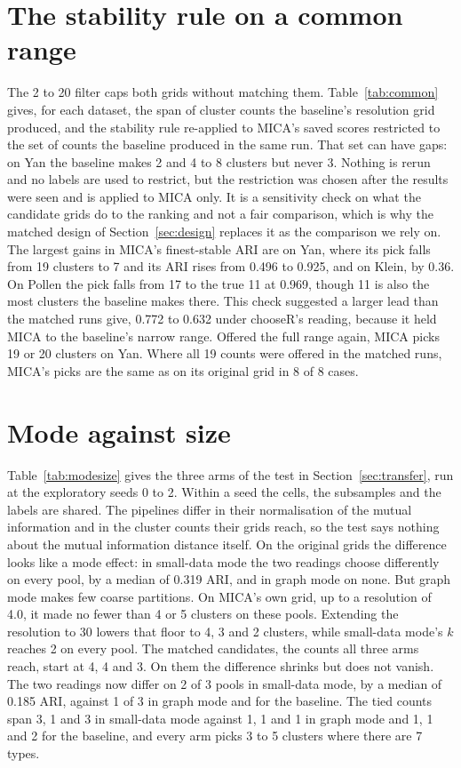 

\section{The stability rule on a common range}\label{app:common}
The 2 to 20 filter caps both grids without matching them. Table~\ref{tab:common} gives, for each
dataset, the span of cluster counts the baseline's resolution grid produced, and the stability
rule re-applied to MICA's saved scores restricted to the set of counts the baseline produced in
the same run. That set can have gaps: on Yan the baseline makes 2 and 4 to 8 clusters but never
3. Nothing is rerun and no labels are used to restrict, but the restriction was chosen after the
results were seen and is applied to MICA only. It is a sensitivity check on what the candidate
grids do to the ranking and not a fair comparison, which is why the matched design of
Section~\ref{sec:design} replaces it as the comparison we rely on. The largest gains in MICA's finest-stable ARI are
on Yan, where its pick falls from 19 clusters to 7 and its ARI rises from 0.496 to 0.925, and on
Klein, by 0.36. On Pollen the pick falls from 17 to the true 11 at 0.969, though 11 is also the
most clusters the baseline makes there. This check suggested a larger lead than the matched runs
give, 0.772 to 0.632 under chooseR's reading, because it held MICA to the baseline's narrow range.
Offered the full range again, MICA picks 19 or 20 clusters on Yan. Where all 19 counts were offered
in the matched runs, MICA's picks are the same as on its original grid in 8 of 8 cases.



\section{Mode against size}\label{app:modesize}
Table~\ref{tab:modesize} gives the three arms of the test in Section~\ref{sec:transfer}, run at the
exploratory seeds 0 to 2. Within a
seed the cells, the subsamples and the labels are shared. The pipelines differ in their
normalisation of the mutual information and in the cluster counts their grids reach, so the test
says nothing about the mutual information distance itself. On the original grids the difference
looks like a mode effect: in small-data mode the two readings choose differently on every pool, by a
median of 0.319 ARI, and in graph mode on none. But graph mode makes few coarse partitions. On MICA's
own grid, up to a resolution of 4.0, it made no fewer than 4 or 5 clusters on these pools. Extending
the resolution to 30 lowers that floor to 4, 3 and 2 clusters, while small-data mode's $k$ reaches 2
on every pool. The matched candidates, the counts all three arms reach, start at 4, 4 and 3. On them
the difference shrinks but does not vanish. The two readings now differ on 2 of 3 pools in small-data mode, by a
median of 0.185 ARI, against 1 of 3 in graph mode and for the baseline. The tied counts span 3, 1 and 3 in small-data mode against
1, 1 and 1 in graph mode and 1, 1 and 2 for the baseline, and every arm picks 3 to 5 clusters where
there are 7 types.

